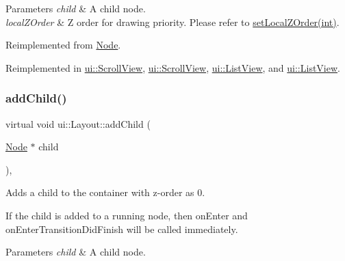 \begin{DoxyParams}{Parameters}
{\em child} & A child node. \\
\hline
{\em local\+Z\+Order} & Z order for drawing priority. Please refer to {\ttfamily \hyperlink{classNode_aee4e616c2d55b722226aae1e68b4946f}{set\+Local\+Z\+Order(int)}}. \\
\hline
\end{DoxyParams}


Reimplemented from \hyperlink{classNode_ad0005bbb94623abd997ce7c3116e6212}{Node}.



Reimplemented in \hyperlink{classui_1_1ScrollView_acfd1b4932c3926cf777ef00235c3386b}{ui\+::\+Scroll\+View}, \hyperlink{classui_1_1ScrollView_a42849e8b7b80ca0bcee880f40de9eccd}{ui\+::\+Scroll\+View}, \hyperlink{classui_1_1ListView_afb7109d348b36c0d672066589ef1e00b}{ui\+::\+List\+View}, and \hyperlink{classui_1_1ListView_a36ef7247ab78ee7019eca8c409a30356}{ui\+::\+List\+View}.

\mbox{\label{classui_1_1Layout_ae08449caf813144448cc3841b1a6dfee}} 
\subsubsection{\texorpdfstring{add\+Child()}{addChild()}\hspace{0.1cm}{\footnotesize\ttfamily [3/8]}}
{\footnotesize\ttfamily virtual void ui\+::\+Layout\+::add\+Child (\begin{DoxyParamCaption}\item[{\hyperlink{classNode}{Node} $\ast$}]{child }\end{DoxyParamCaption})\hspace{0.3cm}{\ttfamily [override]}, {\ttfamily [virtual]}}

Adds a child to the container with z-\/order as 0.

If the child is added to a \textquotesingle{}running\textquotesingle{} node, then \textquotesingle{}on\+Enter\textquotesingle{} and \textquotesingle{}on\+Enter\+Transition\+Did\+Finish\textquotesingle{} will be called immediately.


\begin{DoxyParams}{Parameters}
{\em child} & A child node. \\
\hline
\end{DoxyParams}


